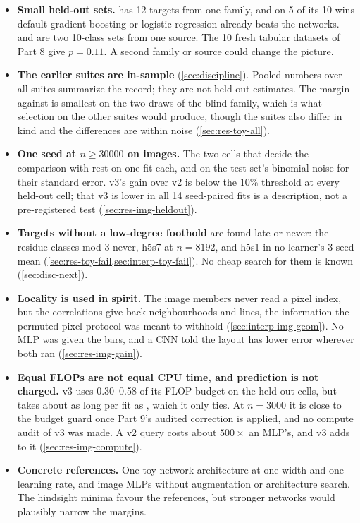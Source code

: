 \begin{itemize}
\item \textbf{Small held-out sets.}  has 12 targets from one family, and on 5 of its 10 wins default gradient boosting or logistic regression already beats the networks.  and  are two 10-class sets from one source. The 10 fresh tabular datasets of Part 8 give $p=0.11$. A second family or source could change the picture.
\item \textbf{The earlier suites are in-sample} (\cref{sec:discipline}). Pooled numbers over all suites summarize the record; they are not held-out estimates. The margin against  is smallest on the two draws of the blind family, which is what selection on the other suites would produce, though the suites also differ in kind and the differences are within noise (\cref{sec:res-toy-all}).
\item \textbf{One seed at $n\ge30000$ on images.} The two cells that decide the comparison with  rest on one fit each, and on the test set's binomial noise for their standard error. v3's gain over v2 is below the 10\% threshold at every held-out cell; that v3 is lower in all 14 seed-paired fits is a description, not a pre-registered test (\cref{sec:res-img-heldout}).
\item \textbf{Targets without a low-degree foothold} are found late or never: the residue classes mod 3 never, h5s7 at $n=8192$, and h5s1 in no learner's 3-seed mean (\cref{sec:res-toy-fail,sec:interp-toy-fail}). No cheap search for them is known (\cref{sec:disc-next}).
\item \textbf{Locality is used in spirit.} The image members never read a pixel index, but the correlations give back neighbourhoods and lines, the information the permuted-pixel protocol was meant to withhold (\cref{sec:interp-img-geom}). No MLP was given the bars, and a CNN told the layout has lower error wherever both ran (\cref{sec:res-img-gain}).
\item \textbf{Equal FLOPs are not equal CPU time, and prediction is not charged.} v3 uses 0.30--0.58 of its FLOP budget on the held-out cells, but takes about as long per fit as , which it only ties. At $n=3000$ it is close to the budget guard once Part 9's audited correction is applied, and no compute audit of v3 was made. A v2 query costs about $500\times$ an MLP's, and v3 adds to it (\cref{sec:res-img-compute}).
\item \textbf{Concrete references.} One toy network architecture at one width and one learning rate, and image MLPs without augmentation or architecture search. The hindsight minima favour the references, but stronger networks would plausibly narrow the margins.

\end{itemize}
